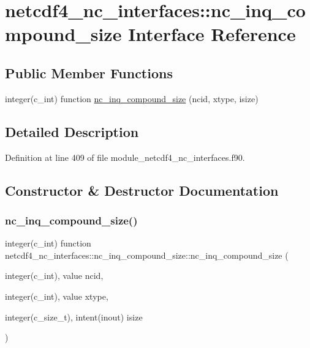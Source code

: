 \hypertarget{interfacenetcdf4__nc__interfaces_1_1nc__inq__compound__size}{}\section{netcdf4\+\_\+nc\+\_\+interfaces\+:\+:nc\+\_\+inq\+\_\+compound\+\_\+size Interface Reference}
\label{interfacenetcdf4__nc__interfaces_1_1nc__inq__compound__size}
\subsection*{Public Member Functions}
\begin{DoxyCompactItemize}
\item 
integer(c\+\_\+int) function \hyperlink{interfacenetcdf4__nc__interfaces_1_1nc__inq__compound__size_ac96597a1798950c352702a354064e5d5}{nc\+\_\+inq\+\_\+compound\+\_\+size} (ncid, xtype, isize)
\end{DoxyCompactItemize}


\subsection{Detailed Description}


Definition at line 409 of file module\+\_\+netcdf4\+\_\+nc\+\_\+interfaces.\+f90.



\subsection{Constructor \& Destructor Documentation}
\mbox{\label{interfacenetcdf4__nc__interfaces_1_1nc__inq__compound__size_ac96597a1798950c352702a354064e5d5}} 
\subsubsection{\texorpdfstring{nc\+\_\+inq\+\_\+compound\+\_\+size()}{nc\_inq\_compound\_size()}}
{\footnotesize\ttfamily integer(c\+\_\+int) function netcdf4\+\_\+nc\+\_\+interfaces\+::nc\+\_\+inq\+\_\+compound\+\_\+size\+::nc\+\_\+inq\+\_\+compound\+\_\+size (\begin{DoxyParamCaption}\item[{integer(c\+\_\+int), value}]{ncid,  }\item[{integer(c\+\_\+int), value}]{xtype,  }\item[{integer(c\+\_\+size\+\_\+t), intent(inout)}]{isize }\end{DoxyParamCaption})}




